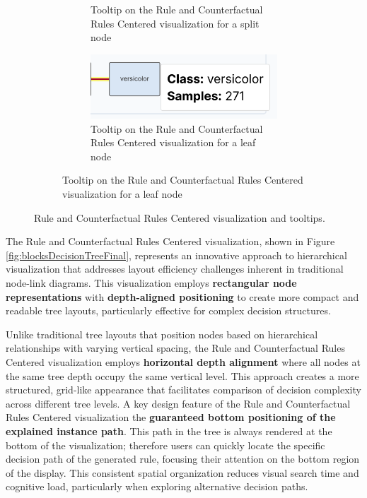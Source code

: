 \begin{figure}[ht!]
\begin{subfigure}[c]{0.28\textwidth}
\begin{subfigure}[c]{\linewidth}
            \caption{Tooltip on the Rule and Counterfactual Rules Centered visualization for a split node}
            \label{fig:blocksDecisionTreeFinalTooltipSplit}
        \end{subfigure}
        \vspace{1cm}
        \begin{subfigure}[c]{\linewidth}
            \centering
            \includegraphics[width=\linewidth]{images/blocksDecisionTreeFinalTooltipLeaf.png}
            \caption{Tooltip on the Rule and Counterfactual Rules Centered visualization for a leaf node}
            \label{fig:blocksDecisionTreeFinalTooltipLeaf}
        \end{subfigure}
    \end{subfigure}
    
    \caption{Rule and Counterfactual Rules Centered visualization and tooltips.}
\end{figure}

The Rule and Counterfactual Rules Centered visualization, shown in Figure \ref{fig:blocksDecisionTreeFinal}, represents an innovative approach to hierarchical visualization that addresses layout efficiency challenges inherent in traditional node-link diagrams. This visualization employs \textbf{rectangular node representations} with \textbf{depth-aligned positioning} to create more compact and readable tree layouts, particularly effective for complex decision structures.

Unlike traditional tree layouts that position nodes based on hierarchical relationships with varying vertical spacing, the Rule and Counterfactual Rules Centered visualization employs \textbf{horizontal depth alignment} where all nodes at the same tree depth occupy the same vertical level. This approach creates a more structured, grid-like appearance that facilitates comparison of decision complexity across different tree levels. 
% 
A key design feature of the Rule and Counterfactual Rules Centered visualization the \textbf{guaranteed bottom positioning of the explained instance path}. This path in the tree is always rendered at the bottom of the visualization; therefore users can quickly locate the specific decision path of the generated rule, focusing their attention on the bottom region of the display. This consistent spatial organization reduces visual search time and cognitive load, particularly when exploring alternative decision paths.

